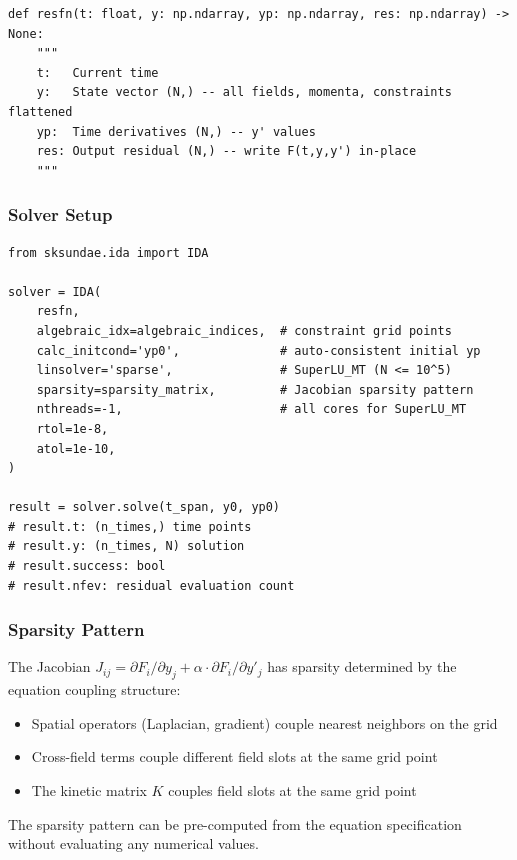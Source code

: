 \begin{lstlisting}[style=python]
def resfn(t: float, y: np.ndarray, yp: np.ndarray, res: np.ndarray) -> None:
    """
    t:   Current time
    y:   State vector (N,) -- all fields, momenta, constraints flattened
    yp:  Time derivatives (N,) -- y' values
    res: Output residual (N,) -- write F(t,y,y') in-place
    """
\end{lstlisting}

\subsubsection{Solver Setup}
\label{sec:solver-setup-code}

\begin{lstlisting}[style=python]
from sksundae.ida import IDA

solver = IDA(
    resfn,
    algebraic_idx=algebraic_indices,  # constraint grid points
    calc_initcond='yp0',              # auto-consistent initial yp
    linsolver='sparse',               # SuperLU_MT (N <= 10^5)
    sparsity=sparsity_matrix,         # Jacobian sparsity pattern
    nthreads=-1,                      # all cores for SuperLU_MT
    rtol=1e-8,
    atol=1e-10,
)

result = solver.solve(t_span, y0, yp0)
# result.t: (n_times,) time points
# result.y: (n_times, N) solution
# result.success: bool
# result.nfev: residual evaluation count
\end{lstlisting}

\subsubsection{Sparsity Pattern}
\label{sec:sparsity-pattern}

The Jacobian $J_{ij} = \partial F_i/\partial y_j + \alpha \cdot \partial F_i/\partial y'_j$ has sparsity determined by
the equation coupling structure:

\begin{itemize}
  \item Spatial operators (Laplacian, gradient) couple nearest neighbors on the grid
  \item Cross-field terms couple different field slots at the same grid point
  \item The kinetic matrix $K$ couples field slots at the same grid point
\end{itemize}

The sparsity pattern can be pre-computed from the equation specification without
evaluating any numerical values.

